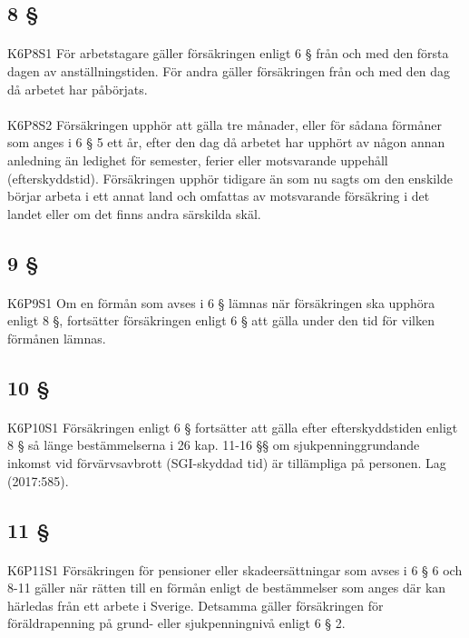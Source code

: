 \documentclass[a4paper,notitlepage,openany,10pt]{book}
\begin{document}
\subsection*{8 §}
\paragraph*{}
{\tiny K6P8S1}
För arbetstagare gäller försäkringen enligt 6 § från och med den första dagen av anställningstiden. För andra gäller försäkringen från och med den dag då arbetet har påbörjats.
\paragraph*{}
{\tiny K6P8S2}
Försäkringen upphör att gälla tre månader, eller för sådana förmåner som anges i 6 § 5 ett år, efter den dag då arbetet har upphört av någon annan anledning än ledighet för semester, ferier eller motsvarande uppehåll (efterskyddstid).
Försäkringen upphör tidigare än som nu sagts om den enskilde börjar arbeta i ett annat land och omfattas av motsvarande försäkring i det landet eller om det finns andra särskilda skäl.
\subsection*{9 §}
\paragraph*{}
{\tiny K6P9S1}
Om en förmån som avses i 6 § lämnas när försäkringen ska upphöra enligt 8 §, fortsätter försäkringen enligt 6 § att gälla under den tid för vilken förmånen lämnas.
\subsection*{10 §}
\paragraph*{}
{\tiny K6P10S1}
Försäkringen enligt 6 § fortsätter att gälla efter efterskyddstiden enligt 8 § så länge bestämmelserna i 26 kap. 11-16 §§ om sjukpenninggrundande inkomst vid förvärvsavbrott (SGI-skyddad tid) är tillämpliga på personen.
Lag (2017:585).
\subsection*{11 §}
\paragraph*{}
{\tiny K6P11S1}
Försäkringen för pensioner eller skadeersättningar som avses i 6 § 6 och 8-11 gäller när rätten till en förmån enligt de bestämmelser som anges där kan härledas från ett arbete i Sverige. Detsamma gäller försäkringen för föräldrapenning på grund- eller sjukpenningnivå enligt 6 § 2.
\end{document}

